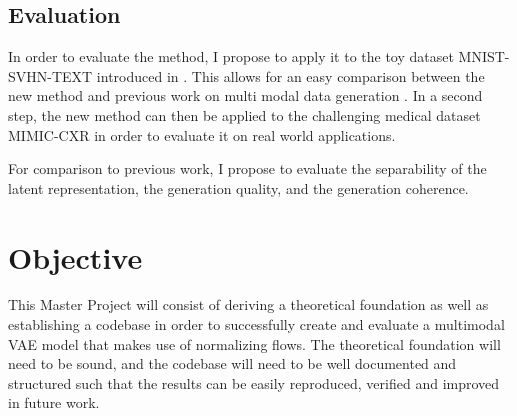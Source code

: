 \documentclass[english]{scrartcl}
\begin{document}
    \subsection{Evaluation}
    In order to evaluate the method, I propose to apply it to the toy dataset MNIST-SVHN-TEXT introduced in \citet{shi_variational_2019}.
    This allows for an easy comparison between the new method and previous work on multi modal data generation \citep[MoPoE, MoE, PoE][]{sutter_generalized_2020, shi_variational_2019, wu_multimodal_2018}.
    In a second step, the new method can then be applied to the challenging medical dataset MIMIC-CXR \citep{johnson_mimic-cxr-jpg_2019} in order to evaluate it on real world applications.

    For comparison to previous work, I propose to evaluate the separability of the latent representation, the generation quality, and the generation coherence.


    \section{Objective}
    This Master Project will consist of deriving a theoretical foundation as well as establishing a codebase in order to successfully create and evaluate a multimodal VAE model that makes use of normalizing flows.
    The theoretical foundation will need to be sound, and the codebase will need to be well documented and structured such that the results can be easily reproduced, verified and improved in future work.

    \printbibliography

%
%
%
\end{document}
